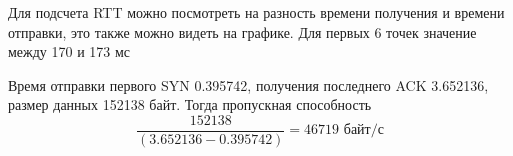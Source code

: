 \documentclass[a4paper,11pt]{article}
\begin{document}
\begin{center}
\label{fig:image}
\end{center}
Для подсчета RTT можно посмотреть на разность времени получения и времени отправки, это также можно видеть на графике. Для первых 6 точек значение между 170 и 173 мс

\begin{center}
\label{fig:image}
\end{center}
Время отправки первого SYN 0.395742, получения последнего ACK 3.652136, размер данных 152138 байт. Тогда пропускная способность 
$$\frac{152138}{(3.652136 - 0.395742)} = 46719 \text{ байт/с}$$
\end{document}
